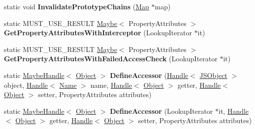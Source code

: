 \begin{DoxyCompactItemize}
\item 
static void {\bfseries Invalidate\+Prototype\+Chains} (\hyperlink{classv8_1_1internal_1_1_map}{Map} $\ast$map)\hypertarget{classv8_1_1internal_1_1_j_s_object_a4894df4069c87dd6f3c543d56dc99ad0}{}\label{classv8_1_1internal_1_1_j_s_object_a4894df4069c87dd6f3c543d56dc99ad0}

\item 
static M\+U\+S\+T\+\_\+\+U\+S\+E\+\_\+\+R\+E\+S\+U\+LT \hyperlink{classv8_1_1_maybe}{Maybe}$<$ Property\+Attributes $>$ {\bfseries Get\+Property\+Attributes\+With\+Interceptor} (Lookup\+Iterator $\ast$it)\hypertarget{classv8_1_1internal_1_1_j_s_object_a53154dc4cc9df72366098b216110ab3c}{}\label{classv8_1_1internal_1_1_j_s_object_a53154dc4cc9df72366098b216110ab3c}

\item 
static M\+U\+S\+T\+\_\+\+U\+S\+E\+\_\+\+R\+E\+S\+U\+LT \hyperlink{classv8_1_1_maybe}{Maybe}$<$ Property\+Attributes $>$ {\bfseries Get\+Property\+Attributes\+With\+Failed\+Access\+Check} (Lookup\+Iterator $\ast$it)\hypertarget{classv8_1_1internal_1_1_j_s_object_afef16a884ae1a10b9e5893f60be19b28}{}\label{classv8_1_1internal_1_1_j_s_object_afef16a884ae1a10b9e5893f60be19b28}

\item 
static \hyperlink{classv8_1_1internal_1_1_maybe_handle}{Maybe\+Handle}$<$ \hyperlink{classv8_1_1internal_1_1_object}{Object} $>$ {\bfseries Define\+Accessor} (\hyperlink{classv8_1_1internal_1_1_handle}{Handle}$<$ \hyperlink{classv8_1_1internal_1_1_j_s_object}{J\+S\+Object} $>$ object, \hyperlink{classv8_1_1internal_1_1_handle}{Handle}$<$ \hyperlink{classv8_1_1internal_1_1_name}{Name} $>$ name, \hyperlink{classv8_1_1internal_1_1_handle}{Handle}$<$ \hyperlink{classv8_1_1internal_1_1_object}{Object} $>$ getter, \hyperlink{classv8_1_1internal_1_1_handle}{Handle}$<$ \hyperlink{classv8_1_1internal_1_1_object}{Object} $>$ setter, Property\+Attributes attributes)\hypertarget{classv8_1_1internal_1_1_j_s_object_ac97d1ed68e9433a947c6a74544c17028}{}\label{classv8_1_1internal_1_1_j_s_object_ac97d1ed68e9433a947c6a74544c17028}

\item 
static \hyperlink{classv8_1_1internal_1_1_maybe_handle}{Maybe\+Handle}$<$ \hyperlink{classv8_1_1internal_1_1_object}{Object} $>$ {\bfseries Define\+Accessor} (Lookup\+Iterator $\ast$it, \hyperlink{classv8_1_1internal_1_1_handle}{Handle}$<$ \hyperlink{classv8_1_1internal_1_1_object}{Object} $>$ getter, \hyperlink{classv8_1_1internal_1_1_handle}{Handle}$<$ \hyperlink{classv8_1_1internal_1_1_object}{Object} $>$ setter, Property\+Attributes attributes)\hypertarget{classv8_1_1internal_1_1_j_s_object_aaae9bab283ec827c7ab4d388812aa5e0}{}\label{classv8_1_1internal_1_1_j_s_object_aaae9bab283ec827c7ab4d388812aa5e0}


\end{DoxyCompactItemize}
